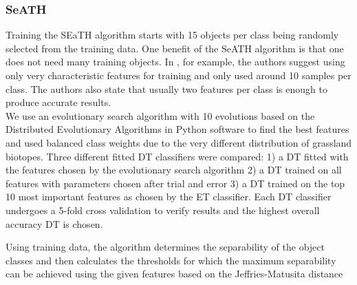 \documentclass[authoryear, review,12pt,number]{elsarticle}
\begin{document}
\subsubsection{SeATH}
Training the SEaTH algorithm starts with 15 objects per class being randomly 
selected from the training data. One benefit of the SeATH algorithm is that one 
does not need many training objects. In \cite{Nussbaum2006}, for example, the 
authors suggest using only very characteristic features for training and only 
used around 10 samples per class. The authors also state that usually two 
features per class is enough to produce accurate results.
\\
We use an evolutionary search algorithm with 10 evolutions based on the 
Distributed Evolutionary Algorithms in Python \citep{DEAP_JMLR2012} software to 
find the best features and used balanced class weights due to the very 
different distribution of grassland biotopes.  Three different fitted DT 
classifiers were compared: 1) a DT fitted with the features chosen by the 
evolutionary search algorithm 2) a DT trained on all features with parameters 
chosen after trial and error 3) a DT trained on the top 10 most important 
features as chosen by the ET classifier. Each DT classifier undergoes a 5-fold 
cross validation to verify results and the highest overall accuracy DT is 
chosen.

Using training data, the algorithm determines the separability of the object 
classes and then calculates the thresholds for which the maximum separability 
can be achieved using the given features based on the Jeffries-Matusita 
distance 
\label{subsec_rulegen_data_mining}
\end{document}

